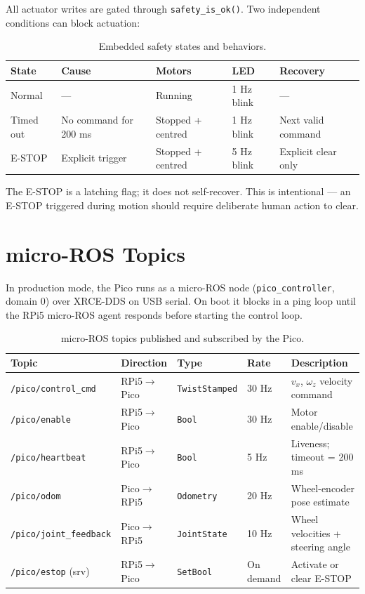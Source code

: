 \documentclass[12pt,a4paper]{report}
\begin{document}
All actuator writes are gated through \texttt{safety\_is\_ok()}. Two independent conditions can block actuation:

\begin{table}[H]
\centering
\caption{Embedded safety states and behaviors.}
\label{tab:pico_safety}
\begin{tabularx}{\textwidth}{|p{2.2cm}|p{2.5cm}|p{1.8cm}|p{2.5cm}|X|}
\hline
\textbf{State} & \textbf{Cause} & \textbf{Motors} & \textbf{LED} & \textbf{Recovery} \\
\hline
Normal & --- & Running & 1 Hz blink & --- \\
\hline
Timed out & No command for 200 ms & Stopped + centred & 1 Hz blink & Next valid command \\
\hline
E-STOP & Explicit trigger & Stopped + centred & 5 Hz blink & Explicit clear only \\
\hline
\end{tabularx}
\end{table}

The E-STOP is a latching flag; it does not self-recover. This is intentional --- an E-STOP triggered during motion should require deliberate human action to clear.

\section{micro-ROS Topics}

In production mode, the Pico runs as a micro-ROS node (\texttt{pico\_controller}, domain 0) over XRCE-DDS on USB serial. On boot it blocks in a ping loop until the RPi5 micro-ROS agent responds before starting the control loop.

\begin{table}[H]
\centering
\caption{micro-ROS topics published and subscribed by the Pico.}
\label{tab:uros_topics}
\begin{tabularx}{\textwidth}{|p{3.8cm}|p{1.6cm}|p{3.2cm}|p{1.3cm}|X|}
\hline
\textbf{Topic} & \textbf{Direction} & \textbf{Type} & \textbf{Rate} & \textbf{Description} \\
\hline
\texttt{/pico/control\_cmd} & RPi5$\rightarrow$Pico & \texttt{TwistStamped} & 30 Hz & $v_x$, $\omega_z$ velocity command \\
\hline
\texttt{/pico/enable} & RPi5$\rightarrow$Pico & \texttt{Bool} & 30 Hz & Motor enable/disable \\
\hline
\texttt{/pico/heartbeat} & RPi5$\rightarrow$Pico & \texttt{Bool} & 5 Hz & Liveness; timeout = 200 ms \\
\hline
\texttt{/pico/odom} & Pico$\rightarrow$RPi5 & \texttt{Odometry} & 20 Hz & Wheel-encoder pose estimate \\
\hline
\texttt{/pico/joint\_feedback} & Pico$\rightarrow$RPi5 & \texttt{JointState} & 10 Hz & Wheel velocities + steering angle \\
\hline
\texttt{/pico/estop} (srv) & RPi5$\rightarrow$Pico & \texttt{SetBool} & On demand & Activate or clear E-STOP \\
\hline
\end{tabularx}
\end{table}
\end{document}
